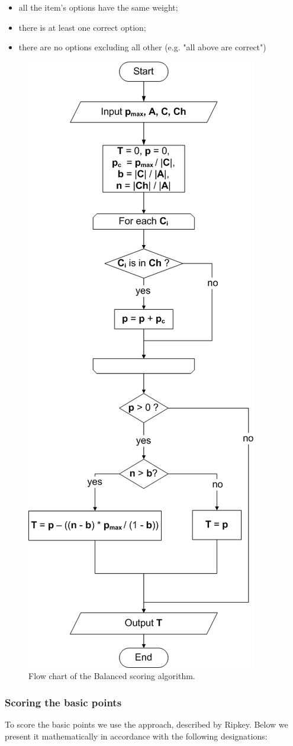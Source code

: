 \begin{itemize}
  \item all the item's options have the same weight;
  \item there is at least one correct option;
  \item there are no options excluding all other (e.g. "all above are correct")
\end{itemize}
\begin{figure}[h!]
	\centering
		\includegraphics[width=.5\columnwidth]{images/algorithm.jpg}
	\caption{Flow chart of the Balanced scoring algorithm.}
	\label{fig:algorithm}
\end{figure}

\subsubsection{Scoring the basic points}

To score the basic points we use the approach, described by Ripkey. 
Below we present it mathematically in accordance with the following designations:

